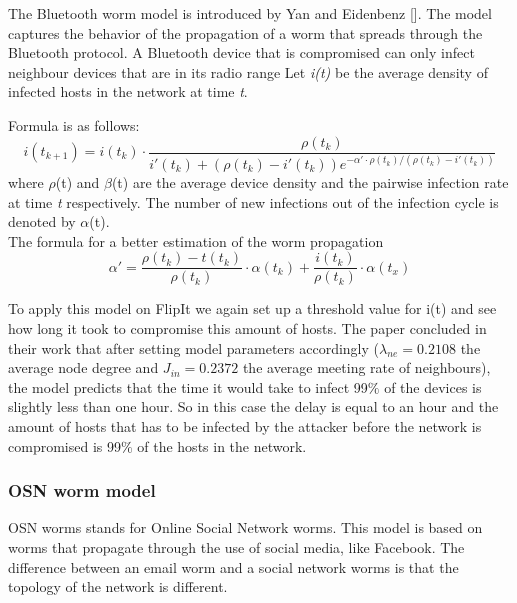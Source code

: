 The Bluetooth worm model is introduced by Yan and Eidenbenz []. The model captures the behavior of the propagation of a worm that spreads through the Bluetooth protocol. 
A Bluetooth device that is compromised can only infect neighbour devices that are in its radio range
Let \textit{i(t)} be the average density of infected hosts in the network at time \textit{t}.

Formula is as follows: 
\begin{equation}
i(t_{k+1})=i(t_{k}) \cdot \dfrac{\rho(t_{k})}{i'(t_{k}) + (\rho(t_{k}) - i'(t_{k}))e^{-\alpha' \cdot \rho(t_{k}) / (\rho(t_{k}) - i'(t_{k}))}}
\end{equation}
where $\rho$(t) and $\beta$(t) are the average device density and the pairwise infection rate at time \textit{t} respectively. The number of new infections out of the infection cycle is denoted by $\alpha$(t).\\

The formula for a better estimation of the worm propagation
\begin{equation}
\alpha'=\dfrac{\rho(t_{k})-t(t_{k})}{\rho(t_{k})} \cdot \alpha(t_{k}) + \dfrac{i(t_{k})}{\rho(t_{k})} \cdot \alpha(t_{x})
\end{equation}

To apply this model on FlipIt we again set up a threshold value for i(t) and see how long it took to compromise this amount of hosts.  The paper concluded in their work  that after setting model parameters accordingly ($\lambda_{ne} = 0.2108$ the average node degree and $J_{in}= 0.2372$ the average meeting rate of neighbours), the model predicts that the time it would take to infect 99$\%$ of the devices is slightly less than one hour. So in this case the delay is equal to an hour and the amount of hosts that has to be infected by the attacker before the network is compromised is 99$\%$ of the hosts in the network.

\subsubsection{OSN worm model}
OSN worms stands for Online Social Network worms. This model is based on worms that propagate through the use of social media, like Facebook. The difference between an email worm and a social network worms is that the topology of the network is different. 

